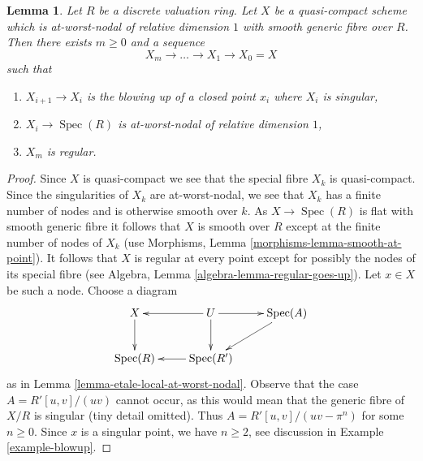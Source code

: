 \documentclass[10pt,a4paper]{amsart}
\theoremstyle{plain}
\newtheorem{lemma}[subsection]{Lemma}
\theoremstyle{definition}
\theoremstyle{remark}
\numberwithin{equation}{subsection}
\def\Spec{\mathop{\mathrm{Spec}}}
\begin{document}
\begin{lemma}
\label{lemma-blowup-at-worst-nodal}
Let $R$ be a discrete valuation ring. Let $X$ be a quasi-compact scheme which
is at-worst-nodal of relative dimension $1$ with smooth generic fibre over $R$.
Then there exists $m \geq 0$ and a sequence
$$
X_m \to \ldots \to X_1 \to X_0 = X
$$
such that
\begin{enumerate}
\item $X_{i + 1} \to X_i$ is the blowing up of a closed point
$x_i$ where $X_i$ is singular,
\item $X_i \to \Spec(R)$ is at-worst-nodal of relative dimension $1$,
\item $X_m$ is regular.
\end{enumerate}
\end{lemma}


\begin{proof}
Since $X$ is quasi-compact we see that the special fibre $X_k$ is quasi-compact.
Since the singularities of $X_k$ are at-worst-nodal, we see
that $X_k$ has a finite number of nodes and is otherwise
smooth over $k$. As $X \to \Spec(R)$ is flat with smooth generic
fibre it follows that $X$ is smooth over $R$ except at the
finite number of nodes of $X_k$
(use Morphisms, Lemma \ref{morphisms-lemma-smooth-at-point}).
It follows that $X$ is regular at every point except for possibly
the nodes of its special fibre
(see Algebra, Lemma \ref{algebra-lemma-regular-goes-up}).
Let $x \in X$ be such a node.
Choose a diagram
$$
\xymatrix{
X \ar[d] &
U \ar[r] \ar[d] \ar[l] &
\Spec(A) \ar[dl] \\
\Spec(R) &
\Spec(R') \ar[l]
}
$$
as in Lemma \ref{lemma-etale-local-at-worst-nodal}.
Observe that the case $A = R'[u, v]/(uv)$ cannot
occur, as this would mean that the generic fibre of
$X/R$ is singular (tiny detail omitted). Thus $A = R'[u, v]/(uv - \pi^n)$
for some $n \geq 0$. Since $x$ is a singular point,
we have $n \geq 2$, see discussion in
Example \ref{example-blowup}.


\end{proof}
\end{document}
